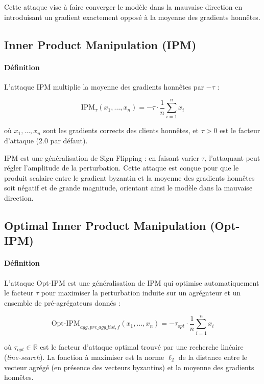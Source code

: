 \documentclass[a4paper,11pt]{article}
\begin{document}
Cette attaque vise à faire converger le modèle dans la mauvaise direction en introduisant un gradient exactement opposé à la moyenne des gradients honnêtes.

\subsection{Inner Product Manipulation (IPM)}

\paragraph{Définition}

L'attaque IPM multiplie la moyenne des gradients honnêtes par $-\tau$ :

\[
\mathrm{IPM}_\tau(x_1,\dots,x_n) = -\tau \cdot \frac{1}{n}\sum_{i=1}^{n} x_i
\]

où $x_1,\dots,x_n$ sont les gradients corrects des clients honnêtes, et $\tau > 0$ est le facteur d'attaque (2.0 par défaut).

IPM est une généralisation de Sign Flipping : en faisant varier $\tau$, l'attaquant peut régler l'amplitude de la perturbation. Cette attaque est conçue pour que le produit scalaire entre le gradient byzantin et la moyenne des gradients honnêtes soit négatif et de grande magnitude, orientant ainsi le modèle dans la mauvaise direction.

\subsection{Optimal Inner Product Manipulation (Opt-IPM)}

\paragraph{Définition}

L'attaque Opt-IPM est une généralisation de IPM qui optimise automatiquement le facteur $\tau$ pour maximiser la perturbation induite sur un agrégateur et un ensemble de pré-agrégateurs donnés :

\[
\mathrm{Opt\text{-}IPM}_{\mathit{agg},\mathit{pre\_agg\_list},f}(x_1,\dots,x_n) = -\tau_{opt} \cdot \frac{1}{n}\sum_{i=1}^{n} x_i
\]

où $\tau_{opt} \in \mathbb{R}$ est le facteur d'attaque optimal trouvé par une recherche linéaire (\emph{line-search}). La fonction à maximiser est la norme $\ell_2$ de la distance entre le vecteur agrégé (en présence des vecteurs byzantins) et la moyenne des gradients honnêtes.
\end{document}
